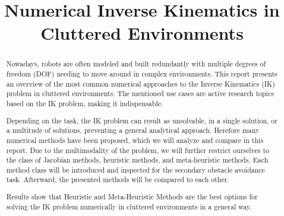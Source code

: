 \documentclass[conference]{IEEEtran}
\begin{document}


%
\title{Numerical Inverse Kinematics in Cluttered Environments}


\author{
}





\maketitle

\begin{abstract}
Nowadays, robots are often modeled and built redundantly with multiple degrees of freedom (DOF) needing to move around in complex environments. This report presents an overview of the most common numerical approaches to the Inverse Kinematics (IK) problem in cluttered environments. The mentioned use cases are active research topics based on the IK problem, making it indispensable.

Depending on the task, the IK problem can result as unsolvable, in a single solution, or a multitude of solutions, preventing a general analytical approach. Herefore many numerical methods have been proposed, which we will analyze and compare in this report. Due to the multimodality of the problem, we will further restrict ourselves to the class of Jacobian methods, heuristic methods, and meta-heuristic methods.
Each method class will be introduced and inspected for the secondary obstacle avoidance task.
Afterward, the presented methods will be compared to each other.

Results show that Heuristic and Meta-Heuristic Methods are the best options for solving the IK problem numerically in cluttered environments in a general way.
\end{abstract}
\end{document}
